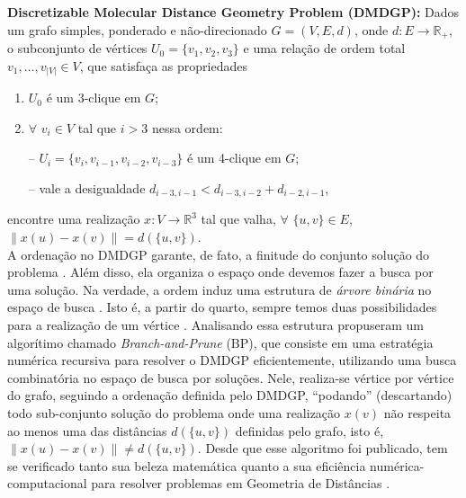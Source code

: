 \documentclass[a4,11pt]{pssbmac}
\begin{document}
	\textbf{Discretizable Molecular Distance Geometry Problem (DMDGP): }Dados um grafo simples, ponderado e não-direcionado $G = (V,E,d)$, onde $d: E \rightarrow \mathbb{R}_{+}$, o subconjunto de vértices $U_{0} = \{v_{1},v_{2},v_{3} \}$ e uma relação de ordem total $v_1, \dots, v_{|V|} \in V$, que satisfaça as propriedades
	\begin{enumerate}
		\item $U_{0}$ é um 3-clique em $G$;
		\vspace{-0.6cm}
		\item 
		\begin{minipage}{0.4\linewidth}  
			$\forall$ $v_{i} \in V$ tal que $i > 3$ nessa ordem:
		\end{minipage}
		\begin{minipage}{0.6\linewidth}
			\vspace{0.6cm}
			-- $U_{i} = \{v_i, v_{i-1}, v_{i-2}, v_{i-3}\}$ é um 4-clique em $G$;
			\vspace{0.2cm}
			
			-- vale a desigualdade $d_{i-3,i-1} < d_{i-3,i-2} + d_{i-2,i-1}$,
		\end{minipage}
		
	\end{enumerate}
	encontre uma realização $x: V \rightarrow \mathbb{R}^{3}$ tal que valha, $\forall$ $\{u,v\} \in E$, $\left\| x(u) - x(v) \right\| = d(\{u,v\})$.
	\\
	
	A ordenação no DMDGP garante, de fato, a finitude do conjunto solução do problema \cite{carlileBook31Coloquio}. Além disso, ela organiza o espaço onde devemos fazer a busca por uma solução. Na verdade, a ordem induz uma estrutura de \textit{árvore binária} no espaço de busca \cite{fidalgotese}. Isto é, a partir do quarto, sempre temos duas possibilidades para a realização de um vértice \cite{carlileDMDGP}. Analisando essa estrutura propuseram um algorítimo chamado \textit{Branch-and-Prune} (BP), que consiste em uma estratégia numérica recursiva para resolver o DMDGP eficientemente, utilizando uma busca combinatória no espaço de busca por soluções. Nele, realiza-se vértice por vértice do grafo, seguindo a ordenação definida pelo DMDGP, ``podando'' (descartando) todo sub-conjunto solução do problema onde uma realização $x(v)$ não respeita ao menos uma das distâncias $d(\{u,v\})$ definidas pelo grafo, isto é, $\left\| x(u) - x(v) \right\| \neq d(\{u,v\})$. Desde que esse algoritmo foi publicado, tem se verificado tanto sua beleza matemática quanto a sua eficiência numérica-computacional para resolver problemas em Geometria de Distâncias \cite{fidalgotese}. 
	
\end{document}
